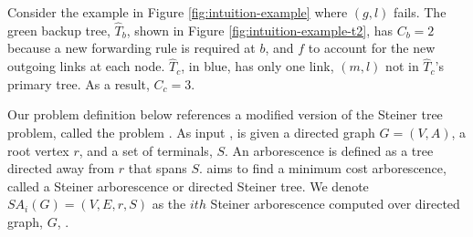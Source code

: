 Consider the example in Figure \ref{fig:intuition-example} where $(g,l)$ fails. The green backup tree, $\hat{T}_b$, shown in Figure \ref{fig:intuition-example-t2}, has $C_b =2$ because 
a new forwarding rule is required at $b$, and $f$ to account for the new outgoing links at each node. $\hat{T}_c$, in blue, has
only one link, $(m,l)$ not in $\hat{T}_c$'s primary tree. As a result, $C_c =3$.

Our \mc problem definition below references a modified version of the Steiner tree problem, called the \arbor problem \cite{Charikar98}. As input \arbors, is given 
a directed graph $G=(V,A)$, a root vertex $r$, and a set of terminals, $S$. An arborescence is defined as a tree directed away from $r$ that spans $S$.  \arbor aims to find a minimum cost 
arborescence, called a Steiner arborescence or directed Steiner tree. We denote $SA_i(G) = (V,E,r,S)$ as the $ith$ Steiner arborescence computed over directed graph, $G$, .

